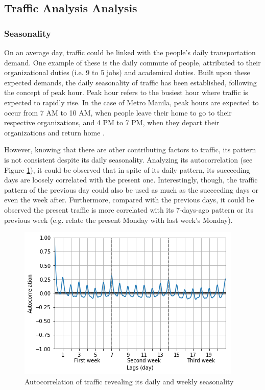 \subsection{Traffic Analysis Analysis}

\subsubsection{Seasonality}

On an average day, traffic could be linked with the people's daily transportation demand. One example of these is the daily commute of people, attributed to their organizational duties (i.e. 9 to 5 jobs) and academical duties. Built upon these expected demands, the daily seasonality of traffic has been established, following the concept of peak hour. Peak hour refers to the busiest hour where traffic is expected to rapidly rise. In the case of Metro Manila, peak hours are expected to occur from 7 AM to 10 AM, when people leave their home to go to their respective organizations, and 4 PM to 7 PM, when they depart their organizations and return home \cite{metro_manila_peak_hour}.

	However, knowing that there are other contributing factors to traffic, its pattern is not consistent despite its daily seasonality. Analyzing its autocorrelation (see Figure \ref{figure_autocorr_traffic_week}), it could be observed that in spite of its daily pattern, its succeeding days are loosely correlated with the present one. Interestingly, though, the traffic pattern of the previous day could also be used as much as the succeeding days or even the week after. Furthermore, compared with the previous days, it could be observed the present traffic is more correlated with its 7-days-ago pattern or its previous week (e.g. relate the present Monday with last week's Monday).
    
    
\begin{figure}
  \includegraphics[width=\linewidth]{figures/figure_autocorr_traffic_week.png}
  \caption{Autocorrelation of traffic revealing its daily and weekly seasonality}
  \label{figure_autocorr_traffic_week}
\end{figure}



